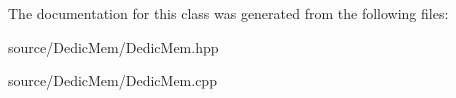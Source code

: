 The documentation for this class was generated from the following files\-:\begin{DoxyCompactItemize}
\item 
source/\-Dedic\-Mem/Dedic\-Mem.\-hpp\item 
source/\-Dedic\-Mem/Dedic\-Mem.\-cpp\end{DoxyCompactItemize}
